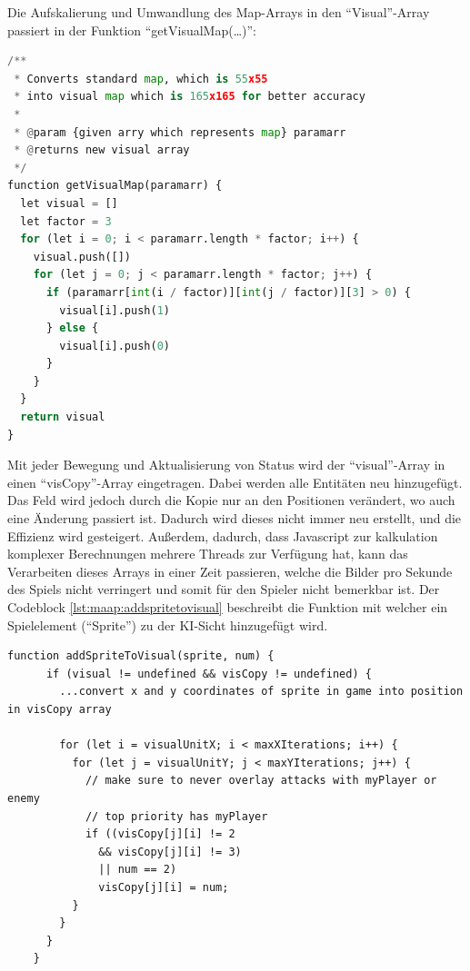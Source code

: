 Die Aufskalierung und Umwandlung des Map-Arrays in den ``Visual''-Array passiert in der Funktion ``getVisualMap(\dots)'':
\begin{lstlisting}[language=Python,label=lst:maap:getVisualMap,caption=Umwandlung des Pixel-Clumps in eine für die KI sichtbare Darstellung]
/**
 * Converts standard map, which is 55x55 
 * into visual map which is 165x165 for better accuracy
 * 
 * @param {given arry which represents map} paramarr 
 * @returns new visual array
 */
function getVisualMap(paramarr) {
  let visual = []
  let factor = 3
  for (let i = 0; i < paramarr.length * factor; i++) {
    visual.push([])
    for (let j = 0; j < paramarr.length * factor; j++) {
      if (paramarr[int(i / factor)][int(j / factor)][3] > 0) {
        visual[i].push(1)
      } else {
        visual[i].push(0)
      }
    }
  }
  return visual
}
\end{lstlisting}
Mit jeder Bewegung und Aktualisierung von Status wird der ``visual''-Array in einen ``visCopy''-Array eingetragen. Dabei werden alle Entitäten neu hinzugefügt. Das Feld wird jedoch durch die Kopie nur an den Positionen verändert, wo auch eine Änderung passiert ist. Dadurch wird dieses nicht immer neu erstellt, und die Effizienz wird gesteigert. Außerdem, dadurch, dass Javascript zur kalkulation komplexer Berechnungen mehrere Threads zur Verfügung hat, kann das Verarbeiten dieses Arrays in einer Zeit passieren, welche die Bilder pro Sekunde des Spiels nicht verringert und somit für den Spieler nicht bemerkbar ist.
Der Codeblock \ref{lst:maap:addspritetovisual} beschreibt die Funktion mit welcher ein
Spielelement (``Sprite'') zu der KI-Sicht hinzugefügt wird.

\begin{lstlisting}[label=lst:maap:addspritetovisual,caption=Sprite in ``visCopy''-Array eintragen]
    function addSpriteToVisual(sprite, num) {
      if (visual != undefined && visCopy != undefined) {
        ...convert x and y coordinates of sprite in game into position in visCopy array
    
        for (let i = visualUnitX; i < maxXIterations; i++) {
          for (let j = visualUnitY; j < maxYIterations; j++) {
            // make sure to never overlay attacks with myPlayer or enemy
            // top priority has myPlayer
            if ((visCopy[j][i] != 2
              && visCopy[j][i] != 3)
              || num == 2)
              visCopy[j][i] = num;
          }
        }
      }
    }
\end{lstlisting}

